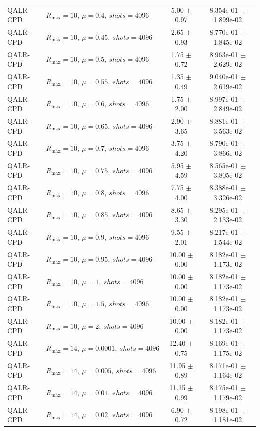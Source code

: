 \begin{table}[t]
\begin{tabular}{@{}llcc@{}}
QALR-CPD & \(R_{\max}=10,\ \mu=0.4,\ shots=4096\) & 5.00 $\pm$ 0.97 & 8.354e-01 $\pm$ 1.899e-02 \\
QALR-CPD & \(R_{\max}=10,\ \mu=0.45,\ shots=4096\) & 2.65 $\pm$ 0.93 & 8.770e-01 $\pm$ 1.845e-02 \\
QALR-CPD & \(R_{\max}=10,\ \mu=0.5,\ shots=4096\) & 1.75 $\pm$ 0.72 & 8.963e-01 $\pm$ 2.629e-02 \\
QALR-CPD & \(R_{\max}=10,\ \mu=0.55,\ shots=4096\) & 1.35 $\pm$ 0.49 & 9.040e-01 $\pm$ 2.619e-02 \\
QALR-CPD & \(R_{\max}=10,\ \mu=0.6,\ shots=4096\) & 1.75 $\pm$ 2.00 & 8.997e-01 $\pm$ 2.849e-02 \\
QALR-CPD & \(R_{\max}=10,\ \mu=0.65,\ shots=4096\) & 2.90 $\pm$ 3.65 & 8.881e-01 $\pm$ 3.563e-02 \\
QALR-CPD & \(R_{\max}=10,\ \mu=0.7,\ shots=4096\) & 3.75 $\pm$ 4.20 & 8.790e-01 $\pm$ 3.866e-02 \\
QALR-CPD & \(R_{\max}=10,\ \mu=0.75,\ shots=4096\) & 5.95 $\pm$ 4.59 & 8.565e-01 $\pm$ 3.805e-02 \\
QALR-CPD & \(R_{\max}=10,\ \mu=0.8,\ shots=4096\) & 7.75 $\pm$ 4.00 & 8.388e-01 $\pm$ 3.326e-02 \\
QALR-CPD & \(R_{\max}=10,\ \mu=0.85,\ shots=4096\) & 8.65 $\pm$ 3.30 & 8.295e-01 $\pm$ 2.133e-02 \\
QALR-CPD & \(R_{\max}=10,\ \mu=0.9,\ shots=4096\) & 9.55 $\pm$ 2.01 & 8.217e-01 $\pm$ 1.544e-02 \\
QALR-CPD & \(R_{\max}=10,\ \mu=0.95,\ shots=4096\) & 10.00 $\pm$ 0.00 & 8.182e-01 $\pm$ 1.173e-02 \\
QALR-CPD & \(R_{\max}=10,\ \mu=1,\ shots=4096\) & 10.00 $\pm$ 0.00 & 8.182e-01 $\pm$ 1.173e-02 \\
QALR-CPD & \(R_{\max}=10,\ \mu=1.5,\ shots=4096\) & 10.00 $\pm$ 0.00 & 8.182e-01 $\pm$ 1.173e-02 \\
QALR-CPD & \(R_{\max}=10,\ \mu=2,\ shots=4096\) & 10.00 $\pm$ 0.00 & 8.182e-01 $\pm$ 1.173e-02 \\
QALR-CPD & \(R_{\max}=14,\ \mu=0.0001,\ shots=4096\) & 12.40 $\pm$ 0.75 & 8.169e-01 $\pm$ 1.175e-02 \\
QALR-CPD & \(R_{\max}=14,\ \mu=0.005,\ shots=4096\) & 11.95 $\pm$ 0.89 & 8.171e-01 $\pm$ 1.164e-02 \\
QALR-CPD & \(R_{\max}=14,\ \mu=0.01,\ shots=4096\) & 11.15 $\pm$ 0.99 & 8.175e-01 $\pm$ 1.179e-02 \\
QALR-CPD & \(R_{\max}=14,\ \mu=0.02,\ shots=4096\) & 6.90 $\pm$ 0.72 & 8.198e-01 $\pm$ 1.181e-02 \\

\end{tabular}
\end{table}
